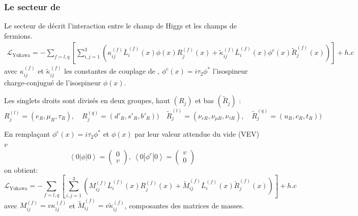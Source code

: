 \subsubsection{Le secteur de }
Le secteur de  décrit l'interaction entre le champ de Higgs et les champs de fermions.
\begin{equation}
\begin{split}
\mathcal{L}_{\mathrm{Yukawa}}=-\sum_{f=l,q}\left[\sum_{i,j=1}^{3}\left(\kappa_{ij}^{(f)}\bar{L}_{i}^{(f)}(x)\phi(x)R_{j}^{(f)}(x)+\tilde{\kappa}_{ij}^{(f)}\bar{L}_{i}^{(f)}(x)\phi^{c}(x)\tilde{R}_{j}^{(f)}(x)\right)\right]+ h.c
\end{split}
\end{equation} 
avec $\kappa_{ij}^{(f)}$ et $\tilde{\kappa}_{ij}^{(f)}$ les constantes de couplage de , $\phi^{c}(x)=i\tau_{2}\phi^{*}$ l'isospineur charge-conjugué de l'isospineur $\phi(x)$.

Les singlets droits sont divisés en deux groupes, haut $\left(R_{j}\right)$ et bas $\left(\tilde{R}_{j}\right)$ :
\begin{equation}
R_j^{(l)}=\left(e_{R},\mu_{R},\tau_{R}\right),\quad R_j^{(q)}=\left(d'_{R},s'_{R},b'_{R}\right)) \quad \tilde{R}_j^{(l)}=\left(\nu_{eR},\nu_{\mu R},\nu_{\tau R}\right),\quad \tilde{R}_j^{(q)}=\left(u_{R},c_{R},t_{R}\right))
\end{equation} 

En remplaçant $\phi^{c}(x)=i\tau_{2}\phi^{*}$ et $\phi(x)$ par leur valeur attendue du vide (VEV) $v$
\begin{equation}
\left<0\left|\phi \right|0\right>=\begin{pmatrix} 0\\v\end{pmatrix},\ \left<0\left|\phi^{c} \right|0\right>=\begin{pmatrix} v\\ 0\end{pmatrix}
\end{equation} on obtient:
\begin{equation}
\mathcal{L}_{\mathrm{Yukawa}}=-\sum_{f=l,q}\left[\sum_{i,j=1}^{3}\left(M^{(f)}_{ij}\bar{L}_{i}^{(f)}(x)R_{j}^{(f)}(x)+\tilde{M}^{(f)}_{ij}\bar{L}_{i}^{(f)}(x)\tilde{R}_{j}^{(f)}(x)\right)\right]+ h.c
\end{equation} 
avec $M^{(f)}_{ij}=v\kappa_{ij}^{(f)}$ et $\tilde{M}^{(f)}_{ij}=v\tilde{\kappa}_{ij}^{(f)}$, composantes des matrices de masses.

